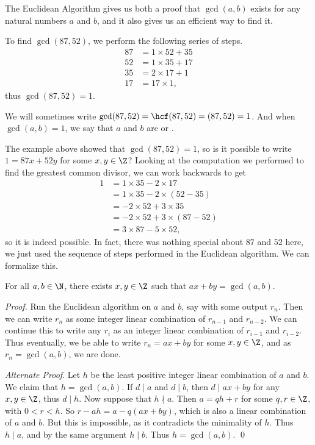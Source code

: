 \documentclass[a4paper]{scrreprt}
\begin{document}
The Euclidean Algorithm gives us both a proof that $\gcd(a, b)$ exists for any natural numbers $a$ and $b$, and it also gives us an efficient way to find it.

\begin{example}
	To find $\gcd(87, 52)$, we perform the following series of steps.
	\begin{align*}
		87 &= 1 \times 52 + 35 \\
		52 &= 1 \times 35 + 17 \\
		35 &= 2 \times 17 + 1\\
		17 &= 17 \times 1,
	\end{align*}
	thus $\gcd(87, 52) = 1$.
\end{example}

\begin{notation}
	We will sometimes write $\gcd(87, 52) = \hcf(87, 52) = (87, 52) = 1$. And when $\gcd(a, b) = 1$, we say that $a$ and $b$ are  or .
\end{notation}

The example above showed that $\gcd(87, 52) = 1$, so is it possible to write $1 = 87x + 52y$ for some $x,y \in \Z$?
Looking at the computation we performed to find the greatest common divisor, we can work backwards to get
\begin{align*}
	1 &= 1 \times 35 - 2 \times 17 \\
	  &= 1 \times 35 - 2 \times (52 - 35) \\
	  &= -2 \times 52 + 3 \times 35 \\
	  &= -2\times 52 + 3 \times (87 - 52) \\
	  &= 3\times 87 - 5 \times 52,
\end{align*}
so it is indeed possible. In fact, there was nothing special about $87$ and $52$ here, we just used the sequence of steps performed in the Euclidean algorithm. We can formalize this.

\begin{theorem}
	For all $a, b \in \N$, there exists $x, y \in \Z$ such that $ax + by = \gcd(a, b)$.
\end{theorem}
\begin{proof} 
	Run the Euclidean algorithm on $a$ and $b$, say with some output $r_n$. Then we can write $r_n$ as some integer linear combination of $r_{n - 1}$ and $r_{n - 2}$.
	We can continue this to write any $r_i$ as an integer linear combination of $r_{i - 1}$ and $r_{i - 2}$. Thus eventually, we be able to write $r_n = ax + by$ for some $x, y \in \Z$, and as $r_n = \gcd(a, b)$, we are done. \hfill \qedhere

	\emph{Alternate Proof}. Let $h$ be the least positive integer linear combination of $a$ and $b$. We claim that $h = \gcd(a, b)$. If $d \mid a$ and $d \mid b$, then $d \mid ax + by$ for any $x, y \in \Z$, thus $d \mid h$. Now suppose that $h \nmid a$. Then $a = qh + r$ for some $q, r \in \Z$, with $0 < r < h$. So $r - ah = a - q(ax + by)$, which is also a linear combination of $a$ and $b$. But this is impossible, as it contradicts the minimality of $h$. Thus $h \mid a$, and by the same argument $h \mid b$. Thus $h = \gcd(a, b)$. \hfill \qed
\end{proof}
\end{document}
